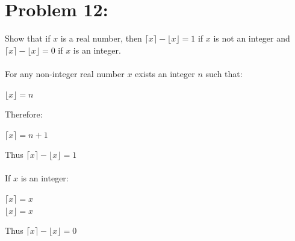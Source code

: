 \documentclass[12pt,en,a4paper]{article}
\begin{document}
	\section*{Problem 12:}
	Show that if $x$ is a real number, then $\lceil x \rceil - \lfloor x \rfloor = 1$ if $x$ is not an integer and $\lceil x \rceil - \lfloor x \rfloor = 0$ if $x$ is an integer.\\\\
	For any non-integer real number $x$ exists an integer $n$ such that:
	\begin{center}
		$\lfloor x\rfloor = n$
	\end{center}
	Therefore:
	\begin{center}
		$\lceil x\rceil = n+1$
	\end{center}
	Thus $\lceil x\rceil - \lfloor x\rfloor=1$\\\\
	If $x$ is an integer:
	\begin{center}
		$\lceil x\rceil = x$\\
		$\lfloor x\rfloor = x$
	\end{center}
	Thus $\lceil x\rceil - \lfloor x\rfloor=0$
\newpage
{}
\end{document}
